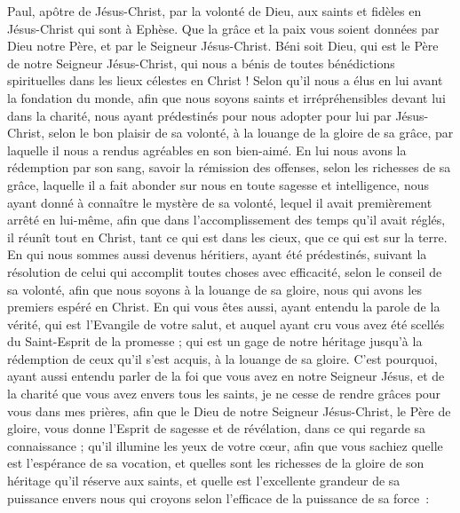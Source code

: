 \par\nobreak\noindent\hrulefill
\begin{multicols}{2}
\VerseOne{}Paul, apôtre de Jésus-Christ, par la volonté de Dieu, aux saints et fidèles en Jésus-Christ qui sont à Ephèse.
Que la grâce et la paix vous soient données par Dieu notre Père, et par le Seigneur Jésus-Christ.
Béni soit Dieu, qui est le Père de notre Seigneur Jésus-Christ, qui nous a bénis de toutes bénédictions spirituelles dans les lieux célestes en Christ !
Selon qu'il nous a élus en lui avant la fondation du monde, afin que nous soyons saints et irrépréhensibles devant lui dans la charité, 
 nous ayant prédestinés pour nous adopter pour lui par Jésus-Christ, selon le bon plaisir de sa volonté,
à la louange de la gloire de sa grâce, par laquelle il nous a rendus agréables en son bien-aimé.
En lui nous avons la rédemption par son sang, savoir la rémission des offenses, selon les richesses de sa grâce,
laquelle il a fait abonder sur nous en toute sagesse et intelligence,
 nous ayant donné à connaître le mystère de sa volonté, lequel il avait premièrement arrêté en lui-même,
afin que dans l'accomplissement des temps qu'il avait réglés, il réunît tout en Christ, tant ce qui est dans les cieux, que ce qui est sur la terre. 
 En qui nous sommes aussi devenus héritiers, ayant été prédestinés, suivant la résolution de celui qui accomplit toutes choses avec efficacité, selon le conseil de sa volonté,
afin que nous soyons à la louange de sa gloire, nous qui avons les premiers espéré en Christ.
En qui vous êtes aussi, ayant entendu la parole de la vérité, qui est  l’Evangile de votre salut, et auquel ayant cru vous avez été scellés du Saint-Esprit de la promesse ;
qui est un gage de notre héritage jusqu'à la rédemption de ceux qu'il s'est acquis, à la louange de sa gloire.
C'est pourquoi, ayant aussi entendu parler de la foi que vous avez en notre Seigneur Jésus, et de la charité que vous avez envers tous les saints,
je ne cesse de rendre grâces pour vous dans mes prières,
afin que le Dieu de notre Seigneur Jésus-Christ, le Père de gloire, vous donne l'Esprit de sagesse et de révélation, dans ce qui regarde sa connaissance ;
qu'il illumine les yeux de votre cœur, afin que vous sachiez quelle est l'espérance de sa vocation, et quelles sont les richesses de la gloire de son héritage qu'il réserve aux saints,
et quelle est l’excellente grandeur de sa puissance envers nous qui croyons selon l’efficace de la puissance de sa force :

\end{multicols}
